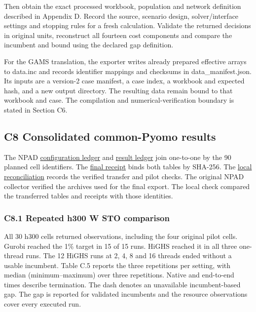 \documentclass[
  english,
  11pt,
  a4paper,
]{article}
\begin{document}
Then obtain the exact processed workbook, population and network
definition described in Appendix D. Record the source, scenario design,
solver/interface settings and stopping rules for a fresh calculation.
Validate the returned decisions in original units, reconstruct all
fourteen cost components and compare the incumbent and bound using the
declared gap definition.

For the GAMS translation, the exporter writes already prepared effective
arrays to data.inc and records identifier mappings and checksums in
data\_manifest.json. Its inputs are a version-2 case manifest, a case
index, a workbook and expected hash, and a new output directory. The
resulting data remain bound to that workbook and case. The compilation
and numerical-verification boundary is stated in Section C6.

\subsection{C8 Consolidated common-Pyomo
results}\label{c8-consolidated-common-pyomo-results}

The NPAD
\href{https://github.com/unb-lamfo-or-ai-hpc/model-agrologistic/blob/docs/editorial-reconciliation-20261105/docs/evidence/pyomo_serial_final_export_20261109/configurations.csv}{configuration
ledger} and
\href{https://github.com/unb-lamfo-or-ai-hpc/model-agrologistic/blob/docs/editorial-reconciliation-20261105/docs/evidence/pyomo_serial_final_export_20261109/results.csv}{result
ledger} join one-to-one by the 90 planned cell identifiers. The
\href{https://github.com/unb-lamfo-or-ai-hpc/model-agrologistic/blob/docs/editorial-reconciliation-20261105/docs/evidence/pyomo_serial_final_export_20261109/final_result.json}{final
receipt} binds both tables by SHA-256. The
\href{https://github.com/unb-lamfo-or-ai-hpc/model-agrologistic/blob/docs/editorial-reconciliation-20261105/docs/evidence/pyomo_serial_final_export_20261109/reconciliation.json}{local
reconciliation} records the verified transfer and pilot
checks. The original NPAD collector verified the archives used for the
final export. The local check compared the transferred tables and
receipts with those identities.

\subsubsection{C8.1 Repeated h300 W STO
comparison}\label{c8.1-repeated-h300-w-sto-comparison}

All 30 h300 cells returned observations, including the four original
pilot cells. Gurobi reached the 1\% target in 15 of 15 runs. HiGHS
reached it in all three one-thread runs. The 12 HiGHS runs at 2, 4, 8
and 16 threads ended without a usable incumbent. Table C.5 reports the
three repetitions per setting, with median
(minimum--maximum) over three repetitions. Native and end-to-end times describe termination. The dash denotes an unavailable incumbent-based gap. The gap is reported for validated incumbents and the resource observations cover every executed run.
\end{document}
